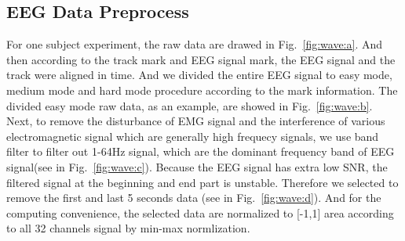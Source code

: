 \documentclass[runningheads,a4paper]{llncs}
\begin{document}
\subsection{EEG Data Preprocess}
For one subject experiment, the raw data are drawed in Fig.~\ref{fig:wave:a}.
And then according to the track mark and EEG signal mark, the EEG signal and
the track were aligned in time. And we divided the entire EEG signal to
easy mode, medium mode and hard mode procedure according to the mark information.
The divided easy mode raw data, as an example, are showed in Fig.~\ref{fig:wave:b}.
Next, to remove the disturbance of EMG signal and the interference of various
electromagnetic signal which are generally high frequecy signals, we use band
filter to filter out 1-64Hz signal, which are the dominant frequency band of EEG
signal(see in Fig.~\ref{fig:wave:c}). Because the EEG signal has extra low SNR,
the filtered signal at the beginning and end part is unstable. Therefore we selected
to remove the first and last 5 seconds data (see in Fig.~\ref{fig:wave:d}).
And for the computing convenience, the selected data are normalized to [-1,1] area
according to all 32 channels signal by min-max normlization.
\end{document}
